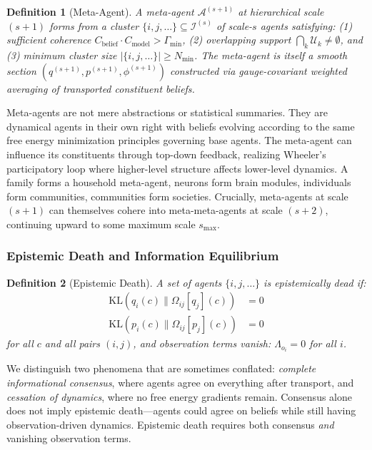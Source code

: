 \documentclass[11pt]{article}
\newtheorem{definition}{Definition}
\begin{document}
\begin{definition}[Meta-Agent]
A meta-agent $\mathcal{A}^{(s+1)}$ at hierarchical scale $(s+1)$ forms from a cluster $\{i, j, \ldots\} \subseteq \mathcal{I}^{(s)}$ of scale-$s$ agents satisfying: (1) sufficient coherence $C_{\text{belief}} \cdot C_{\text{model}} > \Gamma_{\min}$, (2) overlapping support $\bigcap_k \mathcal{U}_k \neq \emptyset$, and (3) minimum cluster size $|\{i, j, \ldots\}| \geq N_{\min}$. The meta-agent is itself a smooth section $(q^{(s+1)}, p^{(s+1)}, \phi^{(s+1)})$ constructed via gauge-covariant weighted averaging of transported constituent beliefs.
\end{definition}

Meta-agents are not mere abstractions or statistical summaries. They are dynamical agents in their own right with beliefs evolving according to the same free energy minimization principles governing base agents. The meta-agent can influence its constituents through top-down feedback, realizing Wheeler's participatory loop where higher-level structure affects lower-level dynamics. A family forms a household meta-agent, neurons form brain modules, individuals form communities, communities form societies. Crucially, meta-agents at scale $(s+1)$ can themselves cohere into meta-meta-agents at scale $(s+2)$, continuing upward to some maximum scale $s_{\max}$.

\subsubsection{Epistemic Death and Information Equilibrium}

\begin{definition}[Epistemic Death]
\label{def:epistemic_death}
A set of agents $\{i, j, \ldots\}$ is epistemically dead if:
\begin{align}
\mathrm{KL}(q_i(c) \| \Omega_{ij}[q_j](c)) &= 0 \\
\mathrm{KL}(p_i(c) \| \Omega_{ij}[p_j](c)) &= 0
\end{align}
for all $c$ and all pairs $(i,j)$, \emph{and} observation terms vanish: $\Lambda_{o_i} = 0$ for all $i$.
\end{definition}

We distinguish two phenomena that are sometimes conflated: \emph{complete informational consensus}, where agents agree on everything after transport, and \emph{cessation of dynamics}, where no free energy gradients remain. Consensus alone does not imply epistemic death---agents could agree on beliefs while still having observation-driven dynamics. Epistemic death requires both consensus \emph{and} vanishing observation terms.
\end{document}
